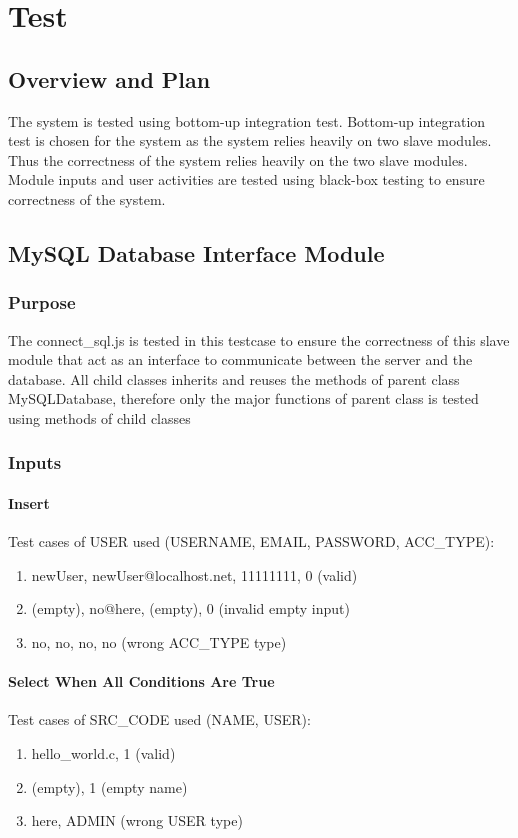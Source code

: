 \chapter{Test}
\section{Overview and Plan}
The system is tested using bottom-up integration test. Bottom-up integration test is chosen for the system as the system relies heavily on two slave modules. Thus the correctness of the system relies heavily on the two slave modules. Module inputs and user activities are tested using black-box testing to ensure correctness of the system.

\section{MySQL Database Interface Module}
\subsection{Purpose}
The connect\_sql.js is tested in this testcase to ensure the correctness of this slave module that act as an interface to communicate between the server and the database. All child classes inherits and reuses the methods of parent class MySQLDatabase, therefore only the major functions of parent class is tested using methods of child classes

\subsection{Inputs}
\subsubsection{Insert}
Test cases of USER used (USERNAME, EMAIL, PASSWORD, ACC\_TYPE):
\begin{enumerate}
  \item newUser, newUser@localhost.net, 11111111, 0 (valid)
  \item (empty), no@here, (empty), 0 (invalid empty input)
  \item no, no, no, no (wrong ACC\_TYPE type)
\end{enumerate}

\subsubsection{Select When All Conditions Are True}
Test cases of SRC\_CODE used (NAME, USER):
\begin{enumerate}
  \item hello\_world.c, 1 (valid)
  \item (empty), 1 (empty name)
  \item here, ADMIN (wrong USER type)
\end{enumerate}

